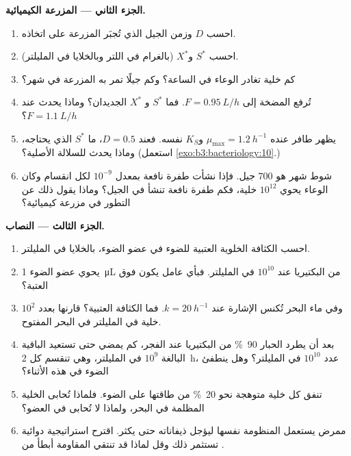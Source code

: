\begin{problem}
\medskip
\noindent\textbf{الجزء الثاني --- المزرعة الكيميائية.}
\begin{enumerate}[resume]
  \item احسب  $D$ وزمن الجيل الذي تُجبَر
        المزرعة على اتخاذه.
  \item احسب $S^{*}$ و$X^{*}$ (بالغرام في اللتر وبالخلايا في المليلتر).
  \item كم خلية تغادر الوعاء في الساعة؟ وكم جيلًا
        تمر به المزرعة في شهر؟
  \item تُرفع المضخة إلى $F = \qty{0.95}{L/h}$. فما $S^{*}$ و
        $X^{*}$ الجديدان؟ وماذا يحدث عند $F = \qty{1.1}{L/h}$؟
  \item يظهر طافر عنده $\mu_{\max} = \qty{1.2}{h^{-1}}$ و$K_{S}$
        نفسه. فعند $D = 0.5$، ما $S^{*}$ الذي يحتاجه، وماذا
        يحدث للسلالة الأصلية؟ (استعمل
        \cref{exo:b3:bacteriology:10}.)
  \item شوط شهر هو $700$ جيل. فإذا نشأت طفرة نافعة
        بمعدل $10^{-9}$ لكل انقسام وكان الوعاء يحوي $10^{12}$
        خلية، فكم طفرة نافعة تنشأ في الجيل؟
        وماذا يقول ذلك عن التطور في مزرعة كيميائية؟
\end{enumerate}

\medskip
\noindent\textbf{الجزء الثالث --- النصاب.}
\begin{enumerate}[resume]
  \item احسب الكثافة الخلوية العتبية للضوء في عضو
        الضوء، بالخلايا في المليلتر.
  \item يحوي عضو الضوء \qty{1}{\micro L} من البكتيريا عند $10^{10}$
        في المليلتر. فبأي عامل يكون  فوق العتبة؟
  \item وفي ماء البحر تُكنس الإشارة عند $k = \qty{20}{h^{-1}}$.
        فما الكثافة العتبية؟ قارنها بعدد $10^{2}$ خلية في المليلتر في
        البحر المفتوح.
  \item بعد أن يطرد الحبار \qty{90}{\%} من البكتيريا عند الفجر،
        كم يمضي حتى تستعيد الباقية البالغة $10^{9}$ في المليلتر، وهي تنقسم كل
        \qty{2}{h}، عدد $10^{10}$ في المليلتر؟ وهل ينطفئ الضوء
        في هذه الأثناء؟
  \item تنفق كل خلية متوهجة نحو \qty{20}{\%} من طاقتها على
        الضوء. فلماذا تُحابى الخلية المظلمة في البحر، ولماذا لا تُحابى في
        العضو؟
  \item ممرض يستعمل المنظومة نفسها ليؤجل ذيفاناته حتى
        يكثر. اقترح استراتيجية دوائية تستثمر ذلك وقل
        لماذا قد تنتقي المقاومة أبطأ من .
\end{enumerate}


\end{problem}
